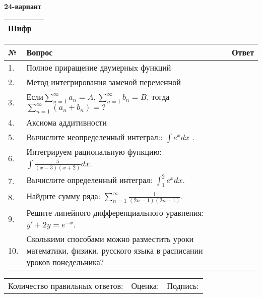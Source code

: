 \documentclass{article}
\begin{document}
  \egroup
  
  \newpage
  
  
  \textbf{24-вариант}\\
  
  \bgroup
  \def\arraystretch{1.6} %
  
  \begin{tabular}{|m{5.7cm}|m{9.5cm}|}
  \hline
  Шифр & \\
  \hline
  \end{tabular}
  
  \vspace{1cm}
  
  \begin{tabular}{|m{0.7cm}|m{10cm}|m{4cm}|}
  \hline
  № & Вопрос & Ответ \\
  \hline
  1. & Полное приращение двумерныx функций &  \\
  \hline
  2. & Метод интегрирования заменой переменной &  \\
  \hline
  3. & Если\(\sum_{n = 1}^{\infty}a_{n} = A,\sum_{n = 1}^{\infty}b_{n} = B\), тогда \(\sum_{n = 1}^{\infty}\left( a_{n} + b_{n} \right) = ?\) &  \\
  \hline
  4. & Аксиома аддитивности &  \\
  \hline
  5. & Вычислите неопределенный интеграл:: \(\int{e^{x}dx}\) . &  \\
  \hline
  6. & Интегрируем рациональную функцию: \(\int{\frac{5}{(x - 3)(x + 2)}dx}\). &  \\
  \hline
  7. & Вычислите определенный интеграл: \(\int_{1}^{2}{e^{x}dx}\). &  \\
  \hline
  8. & Найдите сумму ряда: \(\sum_{n = 1}^{\infty}\frac{1}{(2n - 1)(2n + 1)}\). &  \\
  \hline
  9. & Решите линейного дифференциального уравнения: \(y' + 2y = e^{- x}\). &  \\
  \hline
  10. & Сколькими способами можно разместить уроки математики, физики, русского языка в расписании уроков понедельника? &  \\
  \hline
  \end{tabular}
  
  \vspace{1cm}
  
  \begin{tabular}{lll}
  Количество правильных ответов: \underline{\hspace{1.5cm}} & 
  Оценка: \underline{\hspace{1.5cm}} & 
  Подпись: \underline{\hspace{2cm}} \\
  \end{tabular}
  
\end{document}
